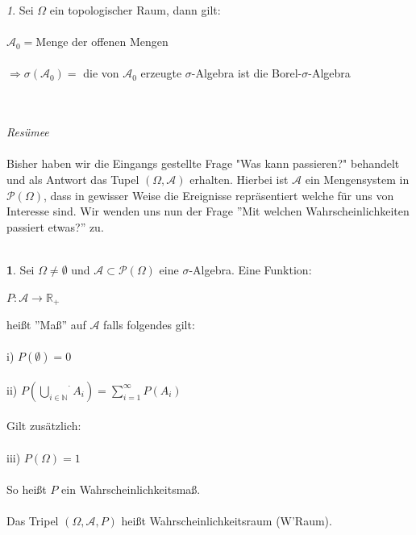 \documentclass[10pt,a4paper]{report}
\numberwithin{equation}{section}
\numberwithin{figure}{section}
\theoremstyle{plain}
\theoremstyle{definition}
\newtheorem{defn}{\protect\definitionname}[section]
\theoremstyle{plain}
\theoremstyle{definition}
\theoremstyle{remark}
\newtheorem{rem}{\protect\remarkname}[section]
\theoremstyle{plain}
\theoremstyle{plain}
\theoremstyle{plain}
\theoremstyle{plain}
\theoremstyle{plain}
\providecommand{\definitionname}{Definition}
\providecommand{\remarkname}{Bemerkung}
\newcommand{\1}{ \mathbb{1} } %
\begin{document}
\begin{rem}
  Sei $\Omega$ ein topologischer Raum, dann gilt:\\\\
  $\mathcal{A}_0=$Menge der offenen Mengen \\\\
  $\Rightarrow \sigma(\mathcal{A}_0)=$ die von $\mathcal{A}_0$ erzeugte $\sigma$-Algebra ist die Borel-$\sigma$-Algebra\\\\\\
\end{rem}
\textit{Resümee}\\\\
Bisher haben wir die Eingangs gestellte Frage "Was kann passieren?" behandelt und als Antwort das Tupel $(\Omega,\mathcal{A})$ erhalten. Hierbei ist $\mathcal{A}$ ein Mengensystem in $\mathcal{P}(\Omega)$, dass in gewisser Weise die Ereignisse repräsentiert welche für uns von Interesse sind. Wir wenden uns nun der Frage ''Mit welchen Wahrscheinlichkeiten passiert etwas?'' zu.\\\\
\begin{defn}
  Sei $\Omega \neq \emptyset$ und $\mathcal{A}\subset
  \mathcal{P}(\Omega)$ eine $\sigma$-Algebra. Eine
  Funktion:\begin{center} $P: \mathcal{A} \rightarrow \mathbb{R}_+$
  \end{center}
  heißt ''Maß'' auf $\mathcal{A}$ falls folgendes gilt:\\\\
  i) $P(\emptyset)=0$\\\\
  ii) $P\left(\stackrel{\cdot}{\bigcup\limits_{i \in \mathbb{N}}}A_i\right)=\sum\limits_{i=1}^\infty P(A_i)$\\\\
  Gilt zusätzlich:\\\\
  iii) $P(\Omega)=1$\\\\
  So heißt $P$ ein Wahrscheinlichkeitsmaß.\\\\
  Das Tripel $(\Omega,\mathcal{A},P)$ heißt Wahrscheinlichkeitsraum (W'Raum).\\\\\\
\end{defn}
\end{document}
